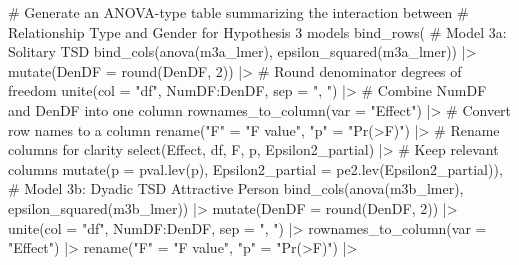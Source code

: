\documentclass[
  bookmarksnumbered]{article}
\newenvironment{Shaded}{\begin{snugshade}}{\end{snugshade}}
\newcommand{\AttributeTok}[1]{\textcolor[rgb]{0.80,0.80,0.80}{#1}}
\newcommand{\CommentTok}[1]{\textcolor[rgb]{0.50,0.62,0.50}{#1}}
\newcommand{\DecValTok}[1]{\textcolor[rgb]{0.86,0.86,0.80}{#1}}
\newcommand{\FunctionTok}[1]{\textcolor[rgb]{0.94,0.94,0.56}{#1}}
\newcommand{\NormalTok}[1]{\textcolor[rgb]{0.80,0.80,0.80}{#1}}
\newcommand{\OtherTok}[1]{\textcolor[rgb]{0.94,0.94,0.56}{#1}}
\newcommand{\SpecialCharTok}[1]{\textcolor[rgb]{0.86,0.64,0.64}{#1}}
\newcommand{\StringTok}[1]{\textcolor[rgb]{0.80,0.58,0.58}{#1}}
\begin{document}
\begin{Shaded}
\begin{Highlighting}[]
\CommentTok{\# Generate an ANOVA{-}type table summarizing the interaction between}
\CommentTok{\# Relationship Type and Gender for Hypothesis 3 models}
\FunctionTok{bind\_rows}\NormalTok{(}
  \CommentTok{\# Model 3a: Solitary TSD}
  \FunctionTok{bind\_cols}\NormalTok{(}\FunctionTok{anova}\NormalTok{(m3a\_lmer), }\FunctionTok{epsilon\_squared}\NormalTok{(m3a\_lmer)) }\SpecialCharTok{|\textgreater{}}
    \FunctionTok{mutate}\NormalTok{(}\AttributeTok{DenDF =} \FunctionTok{round}\NormalTok{(DenDF, }\DecValTok{2}\NormalTok{)) }\SpecialCharTok{|\textgreater{}} \CommentTok{\# Round denominator degrees of freedom}
    \FunctionTok{unite}\NormalTok{(}\AttributeTok{col =} \StringTok{"df"}\NormalTok{, NumDF}\SpecialCharTok{:}\NormalTok{DenDF, }\AttributeTok{sep =} \StringTok{", "}\NormalTok{) }\SpecialCharTok{|\textgreater{}} \CommentTok{\# Combine NumDF and DenDF into one column}
    \FunctionTok{rownames\_to\_column}\NormalTok{(}\AttributeTok{var =} \StringTok{"Effect"}\NormalTok{) }\SpecialCharTok{|\textgreater{}} \CommentTok{\# Convert row names to a column}
    \FunctionTok{rename}\NormalTok{(}\StringTok{"F"} \OtherTok{=} \StringTok{"F value"}\NormalTok{, }\StringTok{"p"} \OtherTok{=} \StringTok{"Pr(\textgreater{}F)"}\NormalTok{) }\SpecialCharTok{|\textgreater{}} \CommentTok{\# Rename columns for clarity}
    \FunctionTok{select}\NormalTok{(Effect, df, F, p, Epsilon2\_partial) }\SpecialCharTok{|\textgreater{}} \CommentTok{\# Keep relevant columns}
    \FunctionTok{mutate}\NormalTok{(}\AttributeTok{p =} \FunctionTok{pval.lev}\NormalTok{(p), }\AttributeTok{Epsilon2\_partial =} \FunctionTok{pe2.lev}\NormalTok{(Epsilon2\_partial)),}
  \CommentTok{\# Model 3b: Dyadic TSD Attractive Person}
  \FunctionTok{bind\_cols}\NormalTok{(}\FunctionTok{anova}\NormalTok{(m3b\_lmer), }\FunctionTok{epsilon\_squared}\NormalTok{(m3b\_lmer)) }\SpecialCharTok{|\textgreater{}}
    \FunctionTok{mutate}\NormalTok{(}\AttributeTok{DenDF =} \FunctionTok{round}\NormalTok{(DenDF, }\DecValTok{2}\NormalTok{)) }\SpecialCharTok{|\textgreater{}}
    \FunctionTok{unite}\NormalTok{(}\AttributeTok{col =} \StringTok{"df"}\NormalTok{, NumDF}\SpecialCharTok{:}\NormalTok{DenDF, }\AttributeTok{sep =} \StringTok{", "}\NormalTok{) }\SpecialCharTok{|\textgreater{}}
    \FunctionTok{rownames\_to\_column}\NormalTok{(}\AttributeTok{var =} \StringTok{"Effect"}\NormalTok{) }\SpecialCharTok{|\textgreater{}}
    \FunctionTok{rename}\NormalTok{(}\StringTok{"F"} \OtherTok{=} \StringTok{"F value"}\NormalTok{, }\StringTok{"p"} \OtherTok{=} \StringTok{"Pr(\textgreater{}F)"}\NormalTok{) }\SpecialCharTok{|\textgreater{}}

\end{Highlighting}
\end{Shaded}
\end{document}
